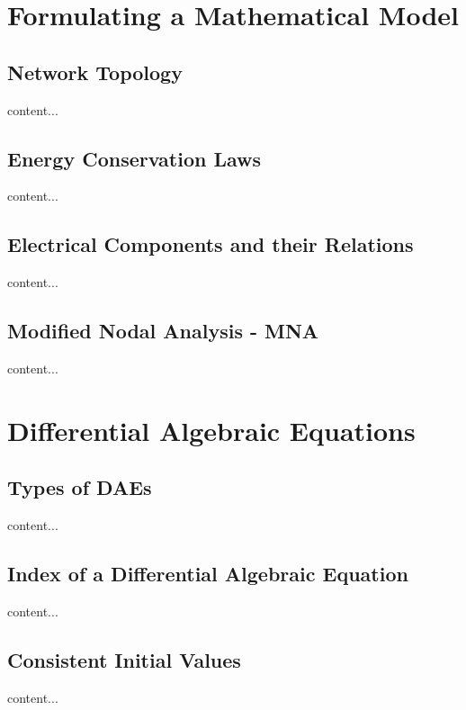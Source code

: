 \section{Formulating a Mathematical Model}
	\subsection{Network Topology}
	\begin{frame}
		content...
	\end{frame}
	\subsection{Energy Conservation Laws}
	\begin{frame}
		content...
	\end{frame}
	\subsection{Electrical Components and their Relations}
	\begin{frame}
		content...
	\end{frame}
	\subsection{Modified Nodal Analysis - MNA}
	\begin{frame}
		content...
	\end{frame}

\section{Differential Algebraic Equations}
	\subsection{Types of DAEs}
	\begin{frame}
		content...
	\end{frame}
	\subsection{Index of a Differential Algebraic Equation}
	\begin{frame}
		content...
	\end{frame}
	\subsection{Consistent Initial Values}
	\begin{frame}
		content...
	\end{frame}

